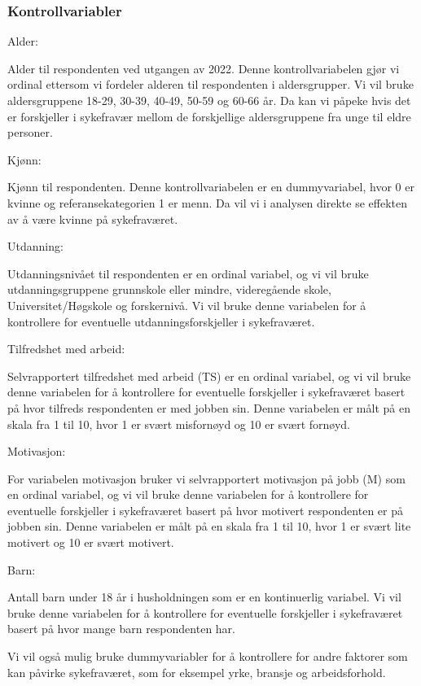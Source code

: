 \documentclass[
  12pt,
  a4paper,
  DIV=11,
  numbers=noendperiod]{scrartcl}
\begin{document}
\subsubsection{Kontrollvariabler}\label{kontrollvariabler}

Alder:

Alder til respondenten ved utgangen av 2022. Denne kontrollvariabelen
gjør vi ordinal ettersom vi fordeler alderen til respondenten i
aldersgrupper. Vi vil bruke aldersgruppene 18-29, 30-39, 40-49, 50-59 og
60-66 år. Da kan vi påpeke hvis det er forskjeller i sykefravær mellom
de forskjellige aldersgruppene fra unge til eldre personer.

Kjønn:

Kjønn til respondenten. Denne kontrollvariabelen er en dummyvariabel,
hvor 0 er kvinne og referansekategorien 1 er menn. Da vil vi i analysen
direkte se effekten av å være kvinne på sykefraværet.

Utdanning:

Utdanningsnivået til respondenten er en ordinal variabel, og vi vil
bruke utdanningsgruppene grunnskole eller mindre, videregående skole,
Universitet/Høgskole og forskernivå. Vi vil bruke denne variabelen for å
kontrollere for eventuelle utdanningsforskjeller i sykefraværet.

Tilfredshet med arbeid:

Selvrapportert tilfredshet med arbeid (TS) er en ordinal variabel, og vi
vil bruke denne variabelen for å kontrollere for eventuelle forskjeller
i sykefraværet basert på hvor tilfreds respondenten er med jobben sin.
Denne variabelen er målt på en skala fra 1 til 10, hvor 1 er svært
misfornøyd og 10 er svært fornøyd.

Motivasjon:

For variabelen motivasjon bruker vi selvrapportert motivasjon på jobb
(M) som en ordinal variabel, og vi vil bruke denne variabelen for å
kontrollere for eventuelle forskjeller i sykefraværet basert på hvor
motivert respondenten er på jobben sin. Denne variabelen er målt på en
skala fra 1 til 10, hvor 1 er svært lite motivert og 10 er svært
motivert.

Barn:

Antall barn under 18 år i husholdningen som er en kontinuerlig variabel.
Vi vil bruke denne variabelen for å kontrollere for eventuelle
forskjeller i sykefraværet basert på hvor mange barn respondenten har.

Vi vil også mulig bruke dummyvariabler for å kontrollere for andre
faktorer som kan påvirke sykefraværet, som for eksempel yrke, bransje og
arbeidsforhold.
\end{document}
